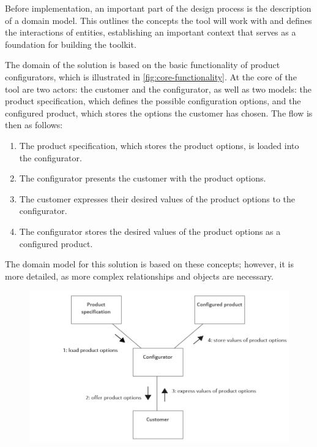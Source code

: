 Before implementation, an important part of the design process is the description of a domain model. This outlines the concepts the tool will work with and defines the interactions of entities, establishing an important context that serves as a foundation for building the toolkit. 

The domain of the solution is based on the basic functionality of product configurators, which is illustrated in \autoref{fig:core-functionality}. At the core of the tool are two actors: the customer and the configurator, as well as two models: the product specification, which defines the possible configuration options, and the configured product, which stores the options the customer has chosen. The flow is then as follows:~\cite{Hansen2003}
\begin{enumerate}
    \item The product specification, which stores the product options, is loaded into the configurator.
    \item The configurator presents the customer with the product options.
    \item The customer expresses their desired values of the product options to the configurator.
    \item The configurator stores the desired values of the product options as a configured product.
\end{enumerate}
The domain model for this solution is based on these concepts; however, it is more detailed, as more complex relationships and objects are necessary.

\begin{figure}[h]
\centering
\includegraphics[width=\textwidth]{images/diagram_communication.png}
\label{fig:core-functionality}
\end{figure}


